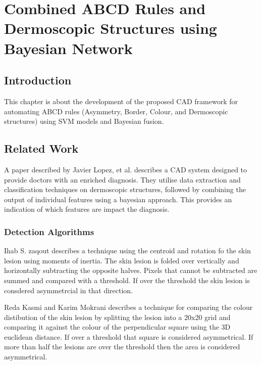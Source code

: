 \chapter{Combined ABCD Rules and Dermoscopic Structures using Bayesian Network}

\section{Introduction}
This chapter is about the development of the proposed CAD framework for automating ABCD rules (Asymmetry, Border, Colour, and Dermoscopic structures) using SVM models and Bayesian fusion.

\section{Related Work}
A paper described by Javier Lopez, et al.\cite{Lopez-Labraca2018} describes a CAD system designed to provide doctors with an enriched diagnosis. They utilise data extraction and classification techniques on dermoscopic structures, followed by combining the output of individual features using a bayesian approach. This provides an indication of which features are impact the diagnosis.




\subsection{Detection Algorithms}
Ihab S. zaqout\cite{Zaqout2016} describes a technique using the centroid and rotation fo the skin lesion using moments of inertia. The skin lesion is folded over vertically and horizontally subtracting the opposite halves. Pixels that cannot be subtracted are summed and compared with a threshold. If over the threshold the skin lesion is consdered asymmetrcial in that direction.

Reda Kasmi and Karim Mokrani\cite{Kasmi2016} describes a technique for comparing the colour distibution of the skin lesion by splitting the lesion into a 20x20 grid and comparing it against the colour of the perpendicular square using the 3D euclidean distance. If over a threshold that square is considered asymmetrical. If more than half the lesions are over the threshold then the area is considered asymmetrical.


